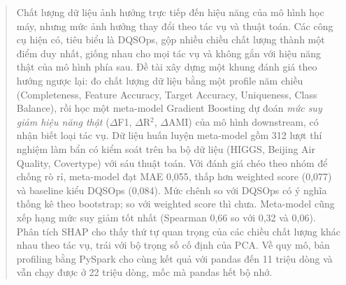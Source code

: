 \begin{abstract}
\noindent
Chất lượng dữ liệu ảnh hưởng trực tiếp đến hiệu năng của mô hình học máy, nhưng mức ảnh hưởng thay đổi theo tác vụ và thuật toán. Các công cụ hiện có, tiêu biểu là DQSOps, gộp nhiều chiều chất lượng thành một điểm duy nhất, giống nhau cho mọi tác vụ và không gắn với hiệu năng thật của mô hình phía sau. Đề tài xây dựng một khung đánh giá theo hướng ngược lại: đo chất lượng dữ liệu bằng một profile năm chiều (Completeness, Feature Accuracy, Target Accuracy, Uniqueness, Class Balance), rồi học một meta-model Gradient Boosting dự đoán \emph{mức suy giảm hiệu năng thật} ($\Delta$F1, $\Delta$R$^2$, $\Delta$AMI) của mô hình downstream, có nhận biết loại tác vụ. Dữ liệu huấn luyện meta-model gồm 312 lượt thí nghiệm làm bẩn có kiểm soát trên ba bộ dữ liệu (HIGGS, Beijing Air Quality, Covertype) với sáu thuật toán. Với đánh giá chéo theo nhóm để chống rò rỉ, meta-model đạt MAE 0,055, thấp hơn weighted score (0,077) và baseline kiểu DQSOps (0,084). Mức chênh so với DQSOps có ý nghĩa thống kê theo bootstrap; so với weighted score thì chưa. Meta-model cũng xếp hạng mức suy giảm tốt nhất (Spearman 0,66 so với 0,32 và 0,06). Phân tích SHAP cho thấy thứ tự quan trọng của các chiều chất lượng khác nhau theo tác vụ, trái với bộ trọng số cố định của PCA. Về quy mô, bản profiling bằng PySpark cho cùng kết quả với pandas đến 11 triệu dòng và vẫn chạy được ở 22 triệu dòng, mốc mà pandas hết bộ nhớ.
\end{abstract}
